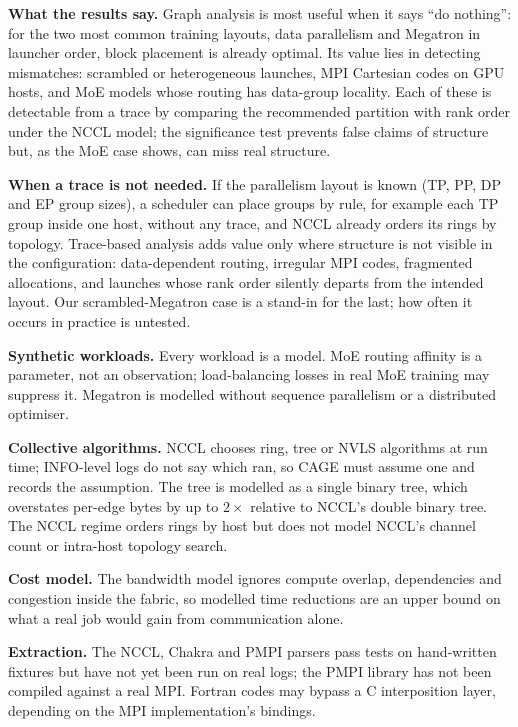 \documentclass[conference]{IEEEtran}
\begin{document}
\textbf{What the results say.} Graph analysis is most useful when it says ``do nothing'': for the
two most common training layouts, data parallelism and Megatron in launcher order, block placement
is already optimal. Its value lies in detecting mismatches: scrambled or heterogeneous launches,
MPI Cartesian codes on GPU hosts, and MoE models whose routing has data-group locality. Each of
these is detectable from a trace by comparing the recommended partition with rank order under the
NCCL model; the significance test prevents false claims of structure but, as the MoE case shows, can
miss real structure.

\textbf{When a trace is not needed.} If the parallelism layout is known (TP, PP, DP and EP group
sizes), a scheduler can place groups by rule, for example each TP group inside one host, without
any trace, and NCCL already orders its rings by topology. Trace-based analysis adds value only where
structure is not visible in the configuration: data-dependent routing, irregular MPI codes,
fragmented allocations, and launches whose rank order silently departs from the intended layout.
Our scrambled-Megatron case is a stand-in for the last; how often it occurs in practice is untested.

\textbf{Synthetic workloads.} Every workload is a model. MoE routing affinity is a parameter, not
an observation; load-balancing losses in real MoE training may suppress it. Megatron is modelled
without sequence parallelism or a distributed optimiser.

\textbf{Collective algorithms.} NCCL chooses ring, tree or NVLS algorithms at run time; INFO-level
logs do not say which ran, so CAGE must assume one and records the assumption. The tree is modelled
as a single binary tree, which overstates per-edge bytes by up to $2\times$ relative to NCCL's
double binary tree. The NCCL regime orders rings by host but does not model NCCL's channel count
or intra-host topology search.

\textbf{Cost model.} The bandwidth model ignores compute overlap, dependencies and congestion inside
the fabric, so modelled time reductions are an upper bound on what a real job would gain from
communication alone.

\textbf{Extraction.} The NCCL, Chakra and PMPI parsers pass tests on hand-written fixtures but have
not yet been run on real logs; the PMPI library has not been compiled against a real MPI. Fortran
codes may bypass a C interposition layer, depending on the MPI implementation's bindings.
\end{document}
